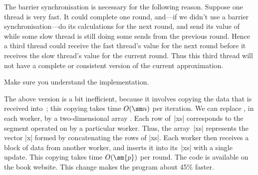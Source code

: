 The barrier synchronisation is necessary for the following reason.  Suppose
one thread is very fast.  It could complete one round, and---if we didn't
use a barrier synchronisation---do its calculations for the next round, and
send its value of  while some slow thread is still doing some
sends from the previous round.  Hence a third thread could receive the fast
thread's value for the next round before it receives the slow thread's value
for the current round.  Thus this third thread will not have a complete or
consistent version of the current approximation. 

\begin{instruction}
Make sure you understand the implementation.
\end{instruction}

The above version is a bit inefficient, because it involves copying the data
that is received into~; this copying takes time $O(\sm n)$ per
iteration.  We can replace , in each worker, by a two-dimensional
array .  Each row of~|xs| corresponds to the segment operated on by
a particular worker.  Thus, the array~|xs| represents the vector |x| formed by
concatenating the rows of |xs|.
Each worker then receives a block of data from another worker, and inserts it
into its~|xs| with a single update.  This copying takes time $O(\sm{p})$ per
round.  The code is available on the book website.  This change makes the
program about 45\% faster.
